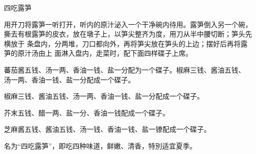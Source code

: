 \begin{recipe}{四吃露笋}

\ingredients


\preparation

\step 用开刀将露笋一听打开，听内的原汁泌入一个干净碗内待用。露笋倒入另一个碗，
撕去有根露笋的皮衣，放在墩子上，以笋尖整齐为度，用刀从半中腰切断；笋头先横放于
条盘内，分两堆，刀口都向外，再将笋尖放在笋头的上边；摆好后再将露笋的原汁汤由上
面淋入盘内，走菜时，配下面四样碟子上席。

\step 蕃茄酱五钱、汤一两、香油一钱、盐一分配为一个碟子。椒麻三钱、酱油五钱、
汤一两、香油一钱、盐一分配成一个碟子。

\step 椒麻三钱、酱油五钱、汤一两、香油一钱、盐一分配成一个碟子。

\step 芥末五钱、醋一两、盐一分、香油一钱配成一个碟子。

\step 芝麻酱五钱、酱油五钱、汤一钱、香油一钱、盐一镣配成一个碟子。

\features

名为“四吃露笋”，即吃四种味道，鲜嫩、清香，特別适宜夏季。

\end{recipe}

